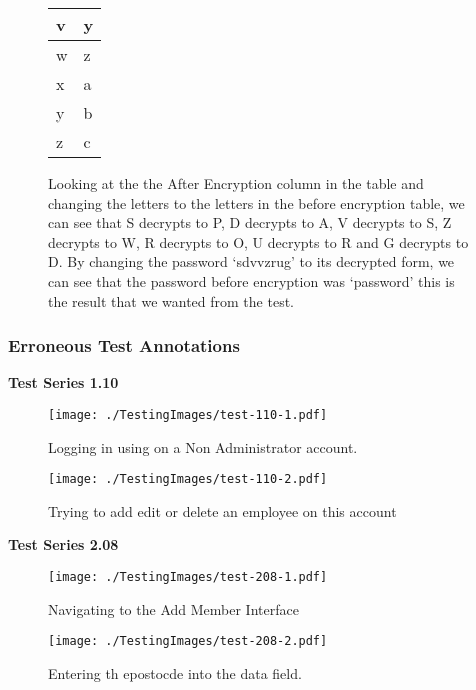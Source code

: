 \begin{figure}[H]
\begin{center}
\begin{tabular}{|p{3.5cm}|p{3.5cm}|}
        v & y\\ \hline
      \rowcolor{light-grey}  w & z\\ \hline
        x & a\\ \hline
        y & b\\ \hline
        z & c\\ \hline
 \end{tabular}
 \end{center}
 \vspace{5mm}
 Looking at the the After Encryption column in the table and changing the letters to the letters in the before encryption table,  we can see that S decrypts to P, D decrypts to A, V decrypts to S, Z decrypts to W, R decrypts to O, U decrypts to R and G decrypts to D. By changing the password `sdvvzrug' to its decrypted form, we can see that the password before encryption was `password' this is the result that we wanted from the test.
\end{figure}

\subsubsection{Erroneous Test Annotations}

\textbf{Test Series 1.10}

\begin{figure}[H]
    \texttt{[image: ./TestingImages/test-110-1.pdf]}
    \caption{Logging in using on a Non Administrator account.}  \label{fig:test-110-1}
\end{figure}

\begin{figure}[H]
    \texttt{[image: ./TestingImages/test-110-2.pdf]}
    \caption{Trying to add edit or delete an employee on this account}  \label{fig:test-110-2}
\end{figure}

\textbf{Test Series 2.08}

\begin{figure}[H]
    \texttt{[image: ./TestingImages/test-208-1.pdf]}
    \caption{Navigating to the Add Member Interface}  \label{fig:test-208-1}
\end{figure}

\begin{figure}[H]
    \texttt{[image: ./TestingImages/test-208-2.pdf]}
    \caption{Entering th epostocde into the data field.}  \label{fig:test-208-2}
\end{figure}

